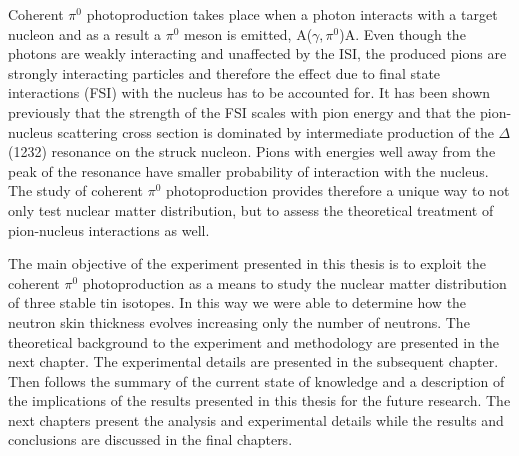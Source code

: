 \indent Coherent $\pi^{0}$ photoproduction takes place when a photon interacts with a target nucleon and as a result a $\pi^{0}$ meson is emitted, A($\gamma,\pi^{0}$)A. Even though the photons are weakly interacting and unaffected by the ISI, the produced pions are strongly interacting particles and therefore the effect due to final state interactions (FSI) with the nucleus has to be accounted for. It has been shown previously that the strength of the FSI scales with pion energy and that the pion-nucleus scattering cross section is dominated by intermediate production of the $\Delta$(1232) resonance on the struck nucleon. Pions with energies well away from the peak of the resonance have smaller probability of interaction with the nucleus. The study of coherent $\pi^{0}$ photoproduction provides therefore a unique way to not only test nuclear matter distribution, but to assess the theoretical treatment of pion-nucleus interactions as well.

\indent The main objective of the experiment presented in this thesis is to exploit the coherent $\pi^{0}$ photoproduction as a means to study the nuclear matter distribution of three stable tin isotopes. In this way we were able to determine how the neutron skin thickness evolves increasing only the number of neutrons. The theoretical background to the experiment and methodology are presented in the next chapter. The experimental details are presented in the subsequent chapter. Then follows the summary of the current state of knowledge and a description of the implications of the results presented in this thesis for the future research. The next chapters present the analysis and experimental details while the results and conclusions are discussed in the final chapters.
